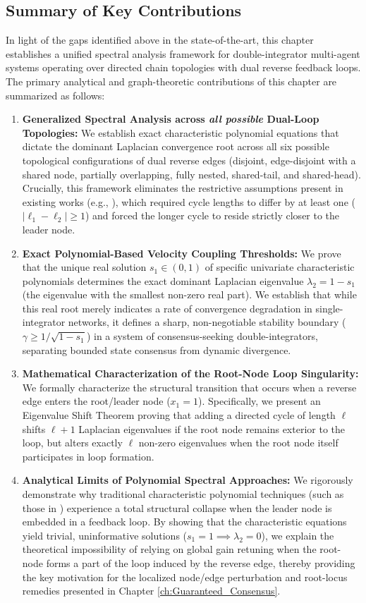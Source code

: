 \subsection*{Summary of Key Contributions}
In light of the gaps identified above in the state-of-the-art, this chapter establishes a unified spectral analysis framework for double-integrator multi-agent systems operating over directed chain topologies with dual reverse feedback loops. The primary analytical and graph-theoretic contributions of this chapter are summarized as follows:
\begin{enumerate}
    \item \textbf{Generalized Spectral Analysis across \emph{all possible} Dual-Loop Topologies:} We establish exact characteristic polynomial equations that dictate the dominant Laplacian convergence root across all six possible topological configurations of dual reverse edges (disjoint, edge-disjoint with a shared node, partially overlapping, fully nested, shared-tail, and shared-head). Crucially, this framework eliminates the restrictive assumptions present in existing works (e.g., \cite{hao2019role}), which required cycle lengths to differ by at least one ($\vert{}\ell_1 - \ell_2\vert{} \ge 1$) and forced the longer cycle to reside strictly closer to the leader node.
    \item \textbf{Exact Polynomial-Based Velocity Coupling Thresholds:} We prove that the unique real solution $s_1 \in (0,1)$ of specific univariate characteristic polynomials determines the exact dominant Laplacian eigenvalue $\lambda_2 = 1 - s_1$ (the eigenvalue with the smallest non-zero real part). We establish that while this real root merely indicates a rate of convergence degradation in single-integrator networks, it defines a sharp, non-negotiable stability boundary ($\gamma \ge 1/\sqrt{1 - s_1}$) in a system of consensus-seeking double-integrators, separating bounded state consensus from dynamic divergence.
    \item \textbf{Mathematical Characterization of the Root-Node Loop Singularity:} We formally characterize the structural transition that occurs when a reverse edge enters the root/leader node ($x_1 = 1$). Specifically, we present an Eigenvalue Shift Theorem proving that adding a directed cycle of length $\ell$ shifts $\ell + 1$ Laplacian eigenvalues if the root node remains exterior to the loop, but alters exactly $\ell$ non-zero eigenvalues when the root node itself participates in loop formation.
    \item \textbf{Analytical Limits of Polynomial Spectral Approaches:} We rigorously demonstrate why traditional characteristic polynomial techniques (such as those in \cite{hao2019role}) experience a total structural collapse when the leader node is embedded in a feedback loop. By showing that the characteristic equations yield trivial, uninformative solutions ($s_1 = 1 \implies \lambda_2 = 0$), we explain the theoretical impossibility of relying on global gain retuning when the root-node forms a part of the loop induced by the reverse edge, thereby providing the key motivation for the localized node/edge perturbation and root-locus remedies presented in Chapter \ref{ch:Guaranteed_Consensus}.
\end{enumerate}

